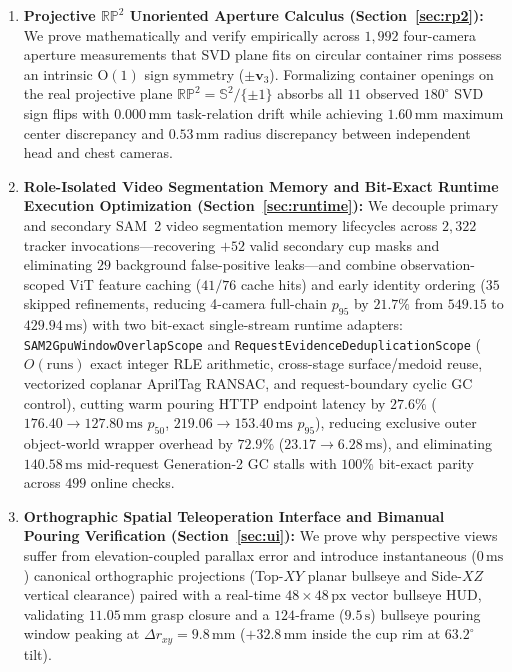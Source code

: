 \documentclass[10pt,journal]{IEEEtran}
\begin{document}
\begin{enumerate}
    \item \textbf{Projective $\mathbb{RP}^2$ Unoriented Aperture Calculus (Section~\ref{sec:rp2}):} We prove mathematically and verify empirically across $1{,}992$ four-camera aperture measurements that SVD plane fits on circular container rims possess an intrinsic $\mathrm{O}(1)$ sign symmetry ($\pm\mathbf{v}_3$). Formalizing container openings on the real projective plane $\mathbb{RP}^2 = \mathbb{S}^2 / \{\pm 1\}$ absorbs all $11$ observed $180^\circ$ SVD sign flips with $0.000\,\mathrm{mm}$ task-relation drift while achieving $1.60\,\mathrm{mm}$ maximum center discrepancy and $0.53\,\mathrm{mm}$ radius discrepancy between independent head and chest cameras.
    \item \textbf{Role-Isolated Video Segmentation Memory and Bit-Exact Runtime Execution Optimization (Section~\ref{sec:runtime}):} We decouple primary and secondary SAM~2 video segmentation memory lifecycles across $2{,}322$ tracker invocations---recovering $+52$ valid secondary cup masks and eliminating $29$ background false-positive leaks---and combine observation-scoped ViT feature caching ($41/76$ cache hits) and early identity ordering ($35$ skipped refinements, reducing 4-camera full-chain $p_{95}$ by $21.7\%$ from $549.15$ to $429.94\,\mathrm{ms}$) with two bit-exact single-stream runtime adapters: \texttt{SAM2GpuWindowOverlapScope} and \texttt{RequestEvidenceDeduplicationScope} ($O(\text{runs})$ exact integer RLE arithmetic, cross-stage surface/medoid reuse, vectorized coplanar AprilTag RANSAC, and request-boundary cyclic GC control), cutting warm pouring HTTP endpoint latency by $27.6\%$ ($176.40 \to 127.80\,\mathrm{ms}$ $p_{50}$, $219.06 \to 153.40\,\mathrm{ms}$ $p_{95}$), reducing exclusive outer object-world wrapper overhead by $72.9\%$ ($23.17 \to 6.28\,\mathrm{ms}$), and eliminating $140.58\,\mathrm{ms}$ mid-request Generation-2 GC stalls with $100\%$ bit-exact parity across $499$ online checks.
    \item \textbf{Orthographic Spatial Teleoperation Interface and Bimanual Pouring Verification (Section~\ref{sec:ui}):} We prove why perspective views suffer from elevation-coupled parallax error and introduce instantaneous ($0\,\mathrm{ms}$) canonical orthographic projections (Top-$XY$ planar bullseye and Side-$XZ$ vertical clearance) paired with a real-time $48\times 48\,\mathrm{px}$ vector bullseye HUD, validating $11.05\,\mathrm{mm}$ grasp closure and a $124$-frame ($9.5\,\mathrm{s}$) bullseye pouring window peaking at $\Delta r_{xy}=9.8\,\mathrm{mm}$ ($+32.8\,\mathrm{mm}$ inside the cup rim at $63.2^\circ$ tilt).
\end{enumerate}
\end{document}
